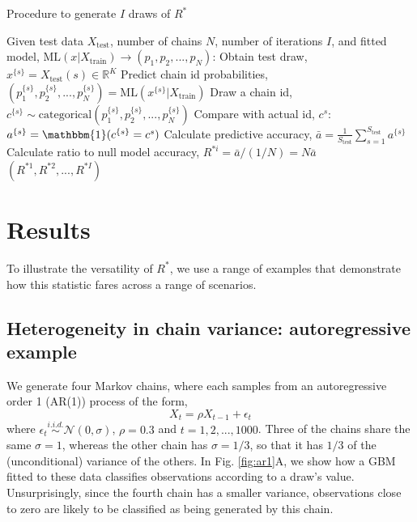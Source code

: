 \documentclass{article}
\begin{document}
\begin{algorithm}[tb]
	\caption{Procedure to generate $I$ draws of $R^*$}
	\label{alg:R_star_uncertainty}
	\begin{algorithmic}
		\STATE Given test data $X_\text{test}$, number of chains $N$, number of iterations $I$, and fitted
		\STATE model, $\text{ML}(x|X_\text{train})\rightarrow(p_1,p_2,...,p_N)$:
		\STATE Obtain test draw, $x^{\{s\}}=X_\text{test}(s)\in \mathbb{R}^K$
		\STATE Predict chain id probabilities, $(p_1^{\{s\}},p_2^{\{s\}},...,p_N^{\{s\}})= \text{ML}(x^{\{s\}}|X_\text{train})$
		\STATE Draw a chain id, $c^{\{s\}} \sim \text{categorical}(p_1^{\{s\}},p_2^{\{s\}},...,p_N^{\{s\}})$
		\STATE Compare with actual id, $c^s$: $a^{\{s\}}=\mathbbm{1}(c^{\{s\}}=c^s)$
		\ENDFOR
		\STATE Calculate predictive accuracy, $\bar{a} = \frac{1}{S_\text{test}} \sum_{s=1}^{S_\text{test}} a^{\{s\}}$
		\STATE Calculate ratio to null model accuracy, $R^{*i} = \bar{a} / (1 / N) = N\bar{a}$
		\ENDFOR
		\RETURN $(R^{*1},R^{*2},...,R^{*I})$
	\end{algorithmic}
\end{algorithm}

\section{Results}\label{sec:results}
To illustrate the versatility of $R^*$, we use a range of examples that demonstrate how this statistic fares across a range of scenarios.

\subsection{Heterogeneity in chain variance: autoregressive example}\label{sec:heterogeneity}
We generate four Markov chains, where each samples from an autoregressive order 1 (AR(1)) process of the form,
%
\begin{equation}
X_t = \rho X_{t-1} + \epsilon_t
\end{equation}
%
where $\epsilon_t\stackrel{i.i.d.}{\sim}\mathcal{N}(0, \sigma)$, $\rho=0.3$ and $t=1,2,...,1000$. Three of the chains share the same $\sigma=1$, whereas the other chain has $\sigma=1/3$, so that it has $1/3$ of the (unconditional) variance of the others. In Fig. \ref{fig:ar1}A, we show how a GBM fitted to these data classifies observations according to a draw's value. Unsurprisingly, since the fourth chain has a smaller variance, observations close to zero are likely to be classified as being generated by this chain.
\end{document}
